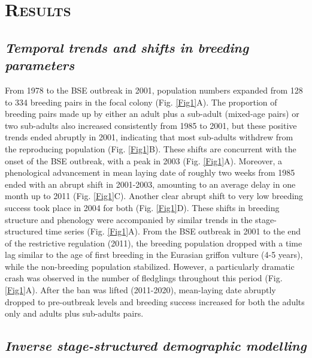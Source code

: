 \documentclass[12pt]{article}
\begin{document}
\section*{\textsc{Results}}

\subsection*{\textit{Temporal trends and shifts in breeding parameters}}
From 1978 to the BSE outbreak in 2001, population numbers expanded from 128 to 334 breeding pairs in the focal colony (Fig. \ref{Fig1}A). The proportion of breeding pairs made up by either an adult plus a sub-adult (mixed-age pairs) or two sub-adults also increased consistently from 1985 to 2001, but these positive trends ended abruptly in 2001, indicating that most sub-adults withdrew from the reproducing population (Fig. \ref{Fig1}B). These shifts are concurrent with the onset of the BSE outbreak, with a peak in 2003 (Fig. \ref{Fig1}A). Moreover, a phenological advancement in mean laying date of roughly two weeks from 1985 ended with an abrupt shift in 2001-2003, amounting to an average delay in one month up to 2011 (Fig. \ref{Fig1}C). Another clear abrupt shift to very low breeding success took place in 2004 for both (Fig. \ref{Fig1}D). These shifts in breeding structure and phenology were accompanied by similar trends in the stage-structured time series (Fig. \ref{Fig1}A). From the BSE outbreak in 2001 to the end of the restrictive regulation (2011), the breeding population dropped with a time lag similar to the age of first breeding in the Eurasian griffon vulture (4-5 years), while the non-breeding population stabilized. However, a particularly dramatic crash was observed in the number of fledglings throughout this period (Fig. \ref{Fig1}A). After the ban was lifted (2011-2020), mean-laying date abruptly dropped to pre-outbreak levels and breeding success increased for both the adults only and adults plus sub-adults pairs.

\subsection*{\textit{Inverse stage-structured demographic modelling}}
\end{document}
